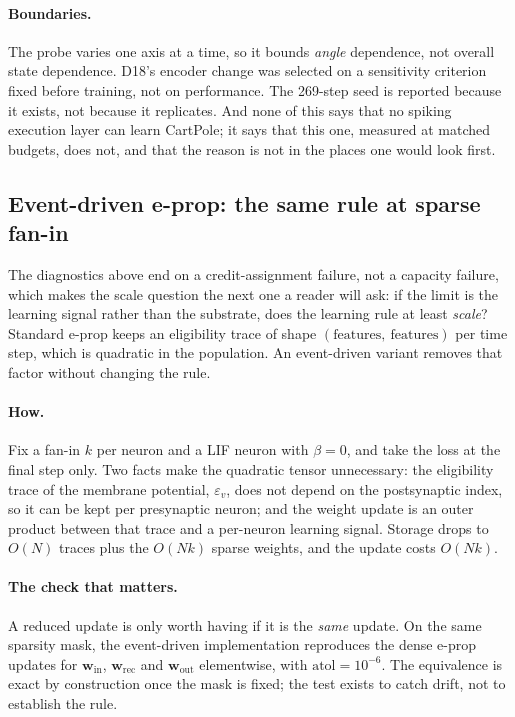\documentclass[11pt]{article}
\begin{document}
\paragraph{Boundaries.} The probe varies one axis at a time, so it bounds
\emph{angle} dependence, not overall state dependence. D18's encoder change was
selected on a sensitivity criterion fixed before training, not on performance.
The 269-step seed is reported because it exists, not because it replicates. And
none of this says that no spiking execution layer can learn CartPole; it says
that this one, measured at matched budgets, does not, and that the reason is not
in the places one would look first.

\subsection{Event-driven e-prop: the same rule at sparse fan-in}
\label{sec:event-driven}

The diagnostics above end on a credit-assignment failure, not a capacity failure,
which makes the scale question the next one a reader will ask: if the limit is
the learning signal rather than the substrate, does the learning rule at least
\emph{scale}? Standard e-prop keeps an eligibility trace of shape
$(\text{features},\ \text{features})$ per time step, which is quadratic in the
population. An event-driven variant removes that factor without changing the
rule.

\paragraph{How.} Fix a fan-in $k$ per neuron and a LIF neuron with
$\beta = 0$, and take the loss at the final step only. Two facts make the
quadratic tensor unnecessary: the eligibility trace of the membrane potential,
$\varepsilon_v$, does not depend on the postsynaptic index, so it can be kept per
presynaptic neuron; and the weight update is an outer product between that trace
and a per-neuron learning signal. Storage drops to $O(N)$ traces plus the
$O(N k)$ sparse weights, and the update costs $O(N k)$.

\paragraph{The check that matters.} A reduced update is only worth having if it
is the \emph{same} update. On the same sparsity mask, the event-driven
implementation reproduces the dense e-prop updates for $\mathbf{w}_{\text{in}}$,
$\mathbf{w}_{\text{rec}}$ and $\mathbf{w}_{\text{out}}$ elementwise, with
$\text{atol} = 10^{-6}$. The equivalence is exact by construction once the mask
is fixed; the test exists to catch drift, not to establish the rule.
\end{document}
